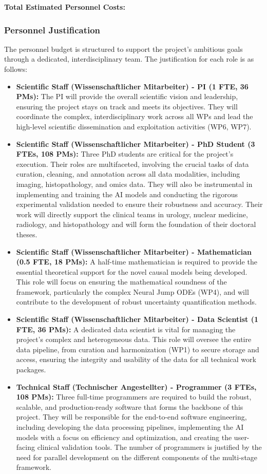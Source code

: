 \textbf{Total Estimated Personnel Costs: }

\subsubsection*{Personnel Justification}
The personnel budget is structured to support the project's ambitious goals through a dedicated, interdisciplinary team. The justification for each role is as follows:
\begin{itemize}
    \item \textbf{Scientific Staff (Wissenschaftlicher Mitarbeiter) - PI (1 FTE, 36 PMs):} The PI will provide the overall scientific vision and leadership, ensuring the project stays on track and meets its objectives. They will coordinate the complex, interdisciplinary work across all WPs and lead the high-level scientific dissemination and exploitation activities (WP6, WP7).
    \item \textbf{Scientific Staff (Wissenschaftlicher Mitarbeiter) - PhD Student (3 FTEs, 108 PMs):} Three PhD students are critical for the project's execution. Their roles are multifaceted, involving the crucial tasks of data curation, cleaning, and annotation across all data modalities, including imaging, histopathology, and omics data. They will also be instrumental in implementing and training the AI models and conducting the rigorous experimental validation needed to ensure their robustness and accuracy. Their work will directly support the clinical teams in urology, nuclear medicine, radiology, and histopathology and will form the foundation of their doctoral theses.
    \item \textbf{Scientific Staff (Wissenschaftlicher Mitarbeiter) - Mathematician (0.5 FTE, 18 PMs):} A half-time mathematician is required to provide the essential theoretical support for the novel causal models being developed. This role will focus on ensuring the mathematical soundness of the framework, particularly the complex Neural Jump ODEs (WP4), and will contribute to the development of robust uncertainty quantification methods.
    \item \textbf{Scientific Staff (Wissenschaftlicher Mitarbeiter) - Data Scientist (1 FTE, 36 PMs):} A dedicated data scientist is vital for managing the project's complex and heterogeneous data. This role will oversee the entire data pipeline, from curation and harmonization (WP1) to secure storage and access, ensuring the integrity and usability of the data for all technical work packages.
    \item \textbf{Technical Staff (Technischer Angestellter) - Programmer (3 FTEs, 108 PMs):} Three full-time programmers are required to build the robust, scalable, and production-ready software that forms the backbone of this project. They will be responsible for the end-to-end software engineering, including developing the data processing pipelines, implementing the AI models with a focus on efficiency and optimization, and creating the user-facing clinical validation tools. The number of programmers is justified by the need for parallel development on the different components of the multi-stage framework.

\end{itemize}
